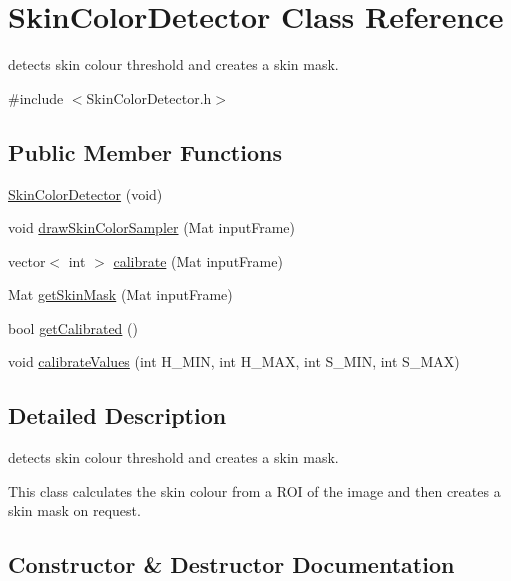 \hypertarget{classSkinColorDetector}{}\section{Skin\+Color\+Detector Class Reference}
\label{classSkinColorDetector}


detects skin colour threshold and creates a skin mask.  




{\ttfamily \#include $<$Skin\+Color\+Detector.\+h$>$}

\subsection*{Public Member Functions}
\begin{DoxyCompactItemize}
\item 
\hyperlink{classSkinColorDetector_ab059f7f926aac46a712db749b4df4f27}{Skin\+Color\+Detector} (void)
\item 
void \hyperlink{classSkinColorDetector_a4eb701f5b2761027b3e752d6b3de46c2}{draw\+Skin\+Color\+Sampler} (Mat input\+Frame)
\item 
vector$<$ int $>$ \hyperlink{classSkinColorDetector_ae8b3880d1d75b07e356cd7d1ff128ed9}{calibrate} (Mat input\+Frame)
\item 
Mat \hyperlink{classSkinColorDetector_a8cf2f51c4c7797a126b767e48458a006}{get\+Skin\+Mask} (Mat input\+Frame)
\item 
bool \hyperlink{classSkinColorDetector_ad02c96fbc75934c86d22dd90ee726373}{get\+Calibrated} ()
\item 
void \hyperlink{classSkinColorDetector_a4739dae25a983fb35a972f3c0ff8faaf}{calibrate\+Values} (int H\+\_\+\+M\+IN, int H\+\_\+\+M\+AX, int S\+\_\+\+M\+IN, int S\+\_\+\+M\+AX)
\end{DoxyCompactItemize}


\subsection{Detailed Description}
detects skin colour threshold and creates a skin mask. 

This class calculates the skin colour from a R\+OI of the image and then creates a skin mask on request. 

\subsection{Constructor \& Destructor Documentation}
\mbox{\label{classSkinColorDetector_ab059f7f926aac46a712db749b4df4f27}} 
